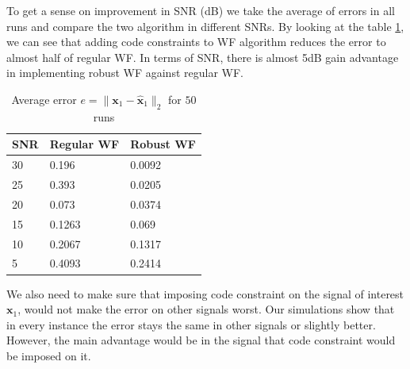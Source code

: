To get a sense on improvement in SNR (dB) we take the average of errors in all runs and compare the two algorithm in different SNRs.
By looking at the table \ref{table:1}, we can see that adding code constraints to WF algorithm reduces the error to almost half of regular WF.
In terms of SNR, there is almost 5dB gain advantage in implementing robust WF against regular WF.
 \begin{table}
  \centering
\caption {Average error $e = \parallel \mathbf{x}_1 - \hat{\mathbf{x}}_1 \parallel_2$ for $50$ runs }
\label{table:1}
 \begin{tabular}{ p{1cm}|p{2.5cm}|p{2.5cm}  }
SNR & Regular WF& Robust WF\\
 \hline
 
 30   &   0.196     & 0.0092   \\
 \hline
 25   &   0.393  &  0.0205\\
 \hline
 20   &   0.073     & 0.0374\\
 \hline
 15   &   0.1263    & 0.069\\
  \hline
 10   &   0.2067    & 0.1317\\
 \hline
 5   &   0.4093  & 0.2414\\

\end{tabular}
\end{table}

We also need to make sure that imposing code constraint on the signal of interest $\mathbf{x}_1$, would not make the error on other signals worst. 
Our simulations show that in every instance the error stays the same in other signals or slightly better. However, the main advantage would be in the signal that code constraint
would be imposed on it.


















